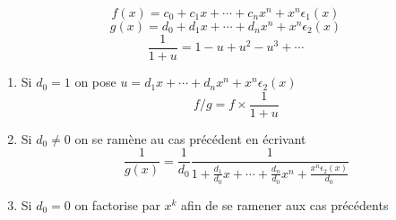 \begin{frame}


$$f(x)=c_0+c_1x + \cdots +c_nx^n + x^n\epsilon_1(x)$$ 
$$g(x)=d_0+d_1x + \cdots +d_nx^n + x^n\epsilon_2(x)$$ \pause
$$\frac{1}{1+u} = 1-u+u^2-u^3+\cdots$$
\pause
\begin{enumerate}
  \item Si $d_0= 1$ on pose $u = d_1x + \cdots +d_nx^n + x^n\epsilon_2(x) $ 
\pause
$$f/g = f \times \frac{1}{1+u}$$
\pause

  \item Si $d_0\neq 0$ on se ramène au cas précédent en écrivant 
\[
\frac{1}{g(x)} =\frac{1}{d_0} \frac{1}{1+\frac{d_1}{d_0}x+\cdots+\frac{d_n}{d_0}x^n
+\frac{x^n\epsilon_2(x)}{d_0}}
\]
 \pause

  \item Si $d_0=0$ on factorise par $x^k$ afin de se ramener aux cas précédents
\end{enumerate}
  
\end{frame}

